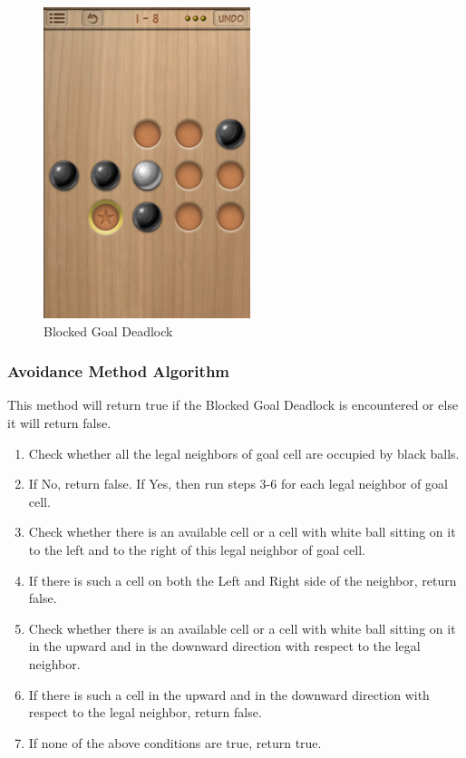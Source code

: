 \documentclass[letterpaper]{article}
\begin{document}
\begin{figure}
\centering
\includegraphics[scale=.5]{Deadlock-3.png} \caption{Blocked Goal Deadlock}
\label{fig:Deadlock3}
\end{figure}

\subsubsection {Avoidance Method Algorithm}
This method will return true if the Blocked Goal Deadlock is encountered or else it will return false.
\begin{enumerate}\addtocounter{enumi}{0}
\item Check whether all the legal neighbors of goal cell are occupied by black balls.
\item If No, return false.
If Yes, then run steps 3-6 for each legal neighbor of goal cell.
\item Check whether there is an available cell or a cell with white ball sitting on it to the left and to the right of this legal neighbor of goal cell.
\item If there is such a cell on both the Left and Right side of the neighbor, return false.
\item Check whether there is an available cell or a cell with white ball sitting on it in the upward and in the downward direction with respect to the legal neighbor.
\item If there is such a cell in the upward and in the downward direction with respect to the legal neighbor, return false.
\item If none of the above conditions are true, return true.
\end{enumerate}
  
\end{document}
